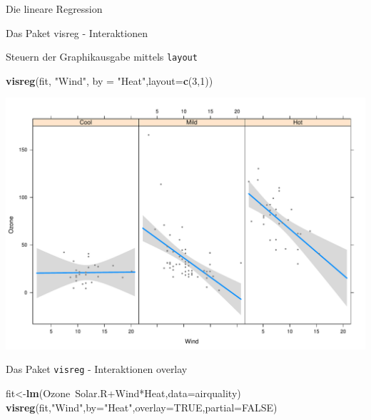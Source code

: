 \documentclass[ignorenonframetext,]{beamer}
\newenvironment{Shaded}{}{}
\newcommand{\KeywordTok}[1]{\textcolor[rgb]{0.00,0.44,0.13}{\textbf{{#1}}}}
\newcommand{\DataTypeTok}[1]{\textcolor[rgb]{0.56,0.13,0.00}{{#1}}}
\newcommand{\DecValTok}[1]{\textcolor[rgb]{0.25,0.63,0.44}{{#1}}}
\newcommand{\StringTok}[1]{\textcolor[rgb]{0.25,0.44,0.63}{{#1}}}
\newcommand{\OtherTok}[1]{\textcolor[rgb]{0.00,0.44,0.13}{{#1}}}
\newcommand{\NormalTok}[1]{{#1}}
\begin{document}
\begin{frame}[fragile]{Die lineare Regression}
\begin{block}{Das Paket visreg - Interaktionen}
\end{block}

\begin{block}{Steuern der Graphikausgabe mittels \texttt{layout}}

\begin{Shaded}
\begin{Highlighting}[]
\KeywordTok{visreg}\NormalTok{(fit, }\StringTok{"Wind"}\NormalTok{, }\DataTypeTok{by =} \StringTok{"Heat"}\NormalTok{,}\DataTypeTok{layout=}\KeywordTok{c}\NormalTok{(}\DecValTok{3}\NormalTok{,}\DecValTok{1}\NormalTok{))}
\end{Highlighting}
\end{Shaded}

\includegraphics{R_intern_files/figure-beamer/unnamed-chunk-311-1.pdf}

\end{block}

\begin{block}{Das Paket \texttt{visreg} - Interaktionen overlay}

\begin{Shaded}
\begin{Highlighting}[]
\NormalTok{fit<-}\KeywordTok{lm}\NormalTok{(Ozone~Solar.R+Wind*Heat,}\DataTypeTok{data=}\NormalTok{airquality)}
\KeywordTok{visreg}\NormalTok{(fit,}\StringTok{"Wind"}\NormalTok{,}\DataTypeTok{by=}\StringTok{"Heat"}\NormalTok{,}\DataTypeTok{overlay=}\OtherTok{TRUE}\NormalTok{,}\DataTypeTok{partial=}\OtherTok{FALSE}\NormalTok{)}
\end{Highlighting}
\end{Shaded}


\end{block}
\end{frame}
\end{document}
